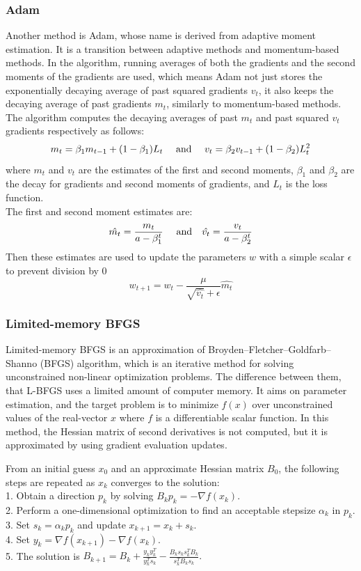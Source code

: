 \subsubsection{Adam}

Another method is Adam, whose name is derived from adaptive moment estimation. It is a transition between adaptive methods and momentum-based methods. In the algorithm, running averages of both the gradients and the second moments of the gradients are used, which means Adam not just stores the exponentially decaying average of past squared gradients $v_t$, it also keeps the decaying average of past gradients $m_t$, similarly to momentum-based methods. The algorithm computes the decaying averages of past $m_t$ and past squared $v_t$ gradients respectively as follows:
$$ m_t = \beta_1 m_{t-1} + (1-\beta_1)L_t ~~~~\hbox{and}~~~\ v_t = \beta_2 v_{t-1} + (1-\beta_2)L^2_t $$
where $m_t$ and $v_t$ are the estimates of the first and second moments, $\beta_1$ and $\beta_2$ are the decay for gradients and second moments of gradients, and $L_t$ is the loss function.\\
The first and second moment estimates are:
$$ \hat{m_t} = \frac{m_t}{a-\beta^t_1} ~~~~\hbox{and}~~~ \hat{v_t} = \frac{v_t}{a-\beta^t_2} $$
Then these estimates are used to update the parameters $w$ with a simple scalar $\epsilon$ to prevent division by 0
$$ w_{t+1} = w_t - \frac{\mu}{\sqrt{\hat{v_t}}+\epsilon}\hat{m_t} $$


\subsubsection{Limited-memory BFGS}

Limited-memory BFGS is an approximation of Broyden–Fletcher–Goldfarb–Shanno (BFGS) algorithm, which is an iterative method for solving unconstrained non-linear optimization problems. The difference between them, that L-BFGS uses a limited amount of computer memory. It aims on parameter estimation, and the target problem is to minimize $f(x)$ over unconstrained values of the real-vector $x$ where $f$ is a differentiable scalar function. In this method, the Hessian matrix of second derivatives is not computed, but it is approximated by using gradient evaluation updates. \medskip

\noindent From an initial guess $x_0$ and an approximate Hessian matrix $B_0$, the following steps are repeated as $x_k$ converges to the solution:\\
1. Obtain a direction $p_k$ by solving $B_k p_k = - \nabla f(x_k). $ \\
2. Perform a one-dimensional optimization to find an acceptable stepsize $\alpha_k$ in $p_k$. \\
3. Set $s_k = \alpha_k p_k$ and update $x_{k+1} = x_k + s_k.$ \\
4. Set $y_k = \nabla f(x_{k+1}) - \nabla f(x_k).$ \\ 
5. The solution is $B_{k+1} = B_k + \frac{y_k y^T_k}{y^T_k s_k} - \frac{B_k s_k s^T_k B_k}{s^T_k B_k s_k}.$

